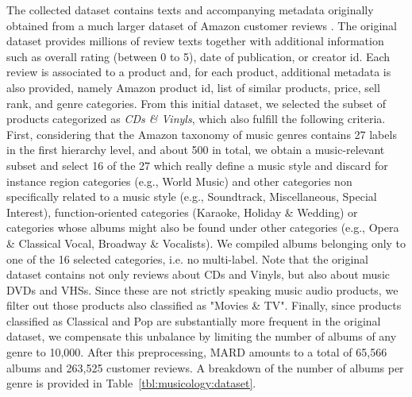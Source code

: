 The collected dataset contains texts and accompanying metadata originally obtained from a much larger dataset of Amazon customer reviews \citep{McAuley2015a,mcauley2015image}. The original dataset provides millions of review texts together with additional information such as overall rating (between 0 to 5), date of publication, or creator id. Each review is associated to a product and, for each product, additional metadata is also provided, namely Amazon product id, list of similar products, price, sell rank, and genre categories. From this initial dataset, we selected the subset of products categorized as \textit{CDs \& Vinyls}, which also fulfill the following criteria. First, considering that the Amazon taxonomy of music genres contains 27 labels in the first hierarchy level, and about 500 in total, we obtain a music-relevant subset and select 16 of the 27 which really define a music style and discard for instance region categories (e.g., World Music) and other categories non specifically related to a music style (e.g., Soundtrack, Miscellaneous, Special Interest), function-oriented categories (Karaoke, Holiday \& Wedding) or categories whose albums might also be found under other categories (e.g., Opera \& Classical Vocal, Broadway \& Vocalists). We compiled albums belonging only to one of the 16 selected categories, i.e. no multi-label. Note that the original dataset contains not only reviews about CDs and Vinyls, but also about music DVDs and VHSs. Since these are not strictly speaking music audio products, we filter out those products also classified as "Movies \& TV". Finally, since products classified as Classical and Pop are substantially more frequent in the original dataset, we compensate this unbalance by limiting the number of albums of any genre to 10,000. After this preprocessing, MARD amounts to a total of 65,566 albums and 263,525 customer reviews. A breakdown of the number of albums per genre is provided in Table~\ref{tbl:musicology:dataset}.

